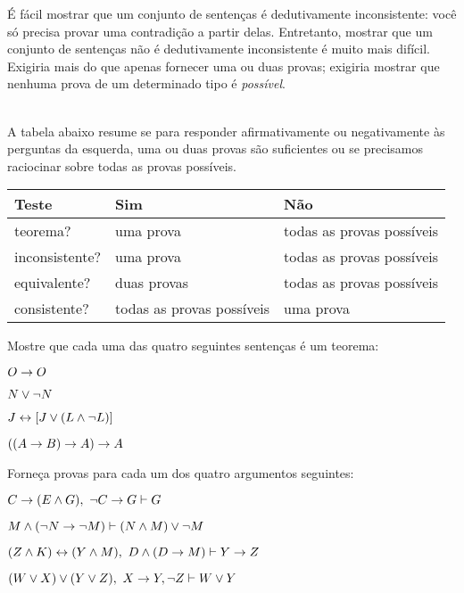         É fácil mostrar que um conjunto de sentenças é dedutivamente inconsistente: você só precisa provar uma contradição a partir delas.  Entretanto,  mostrar que um conjunto de sentenças não é dedutivamente inconsistente é muito mais difícil. Exigiria mais do que apenas fornecer uma ou duas provas; exigiria mostrar que nenhuma prova de um determinado tipo é \emph{possível}.

\
\\
A tabela abaixo resume se para responder afirmativamente ou negativamente às perguntas da esquerda, uma ou duas provas são suficientes ou se precisamos raciocinar sobre todas as provas possíveis.
{ %
\begin{center}
\begin{tabular}{l l l}
\cline{1-3}
 \textbf{Teste}& \textbf{Sim} & \textbf{ Não}\\
 \hline
teorema? & uma prova & todas as provas possíveis\\
inconsistente? &  uma prova  & todas as provas possíveis\\
equivalente? & duas provas & todas as provas possíveis\\
consistente? & todas as provas possíveis & uma prova\\
\cline{1-3}
\end{tabular}
\end{center}}


 
\practiceproblems
\problempart
Mostre que cada uma das quatro seguintes sentenças é um teorema:
\begin{earg}
\item $O \rightarrow O$
\item $N \vee \neg N$
\item $J \leftrightarrow [J\vee (L\wedge\neg L)]$
\item $((A \rightarrow B) \rightarrow A) \rightarrow A$ 
\end{earg}

\problempart
Forneça provas para cada um dos quatro argumentos seguintes:
\begin{earg}
\item $C\rightarrow(E\wedge G), \, \,  \neg C \rightarrow G \vdash G$
\item $M \wedge (\neg N \rightarrow \neg M) \vdash (N \wedge M) \vee \neg M$
\item $(Z\wedge K)\leftrightarrow(Y\wedge M), \, \,  D\wedge(D\rightarrow M) \vdash Y\rightarrow Z$
\item $(W \vee X) \vee (Y \vee Z), \, \, X\rightarrow Y, \neg Z \vdash W\vee Y$
\end{earg}

